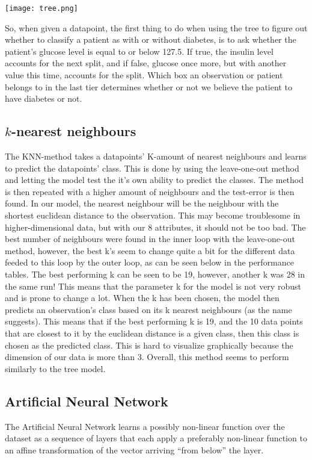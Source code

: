 \texttt{[image: tree.png]}

So, when given a datapoint, the first thing to do when using the tree to figure
out whether to classify a patient as with or without diabetes, is to ask whether
the patient's glucose level is equal to or below 127.5. If true, the insulin level
accounts for the next split, and if false, glucose once more, but with another
value this time, accounts for the split. Which box an observation or patient belongs
to in the last tier determines whether or not we believe the patient to have diabetes
or not.

\subsection{$k$-nearest neighbours}
The KNN-method takes a datapoints' K-amount of nearest neighbours and learns to predict the datapoints' class.
This is done by using the leave-one-out method and letting the model test the it's own ability to predict the classes.
The method is then repeated with a higher amount of neighbours and the test-error is then found. In our model, the nearest
neighbour will be the neighbour with the shortest euclidean distance to the observation.
This may become troublesome in higher-dimensional data, but with our 8 attributes, it should
not be too bad. The best number of neighbours were found in the inner loop with
the leave-one-out method, however, the best k's seem to change quite a bit for the
different data feeded to this loop by the outer loop, as can be seen below in the performance
tables. The best performing k can be seen to be 19, however, another k was
28 in the same run! This means that the parameter k for the model is not very
robust and is prone to change a lot. When the k has been chosen, the model then
predicts an observation's class based on its k nearest neighbours (as the
name suggests). This means that if the best performing k is 19, and the 10
data points that are closest to it by the euclidean distance is a given class,
then this class is chosen as the predicted class. This is hard to visualize
graphically because the dimension of our data is more than 3. Overall, this
method seems to perform similarly to the tree model.

\subsection{Artificial Neural Network}
The Artificial Neural Network learns a possibly non-linear function
over the dataset as a sequence of layers that each apply
a preferably non-linear function to an affine transformation of the vector arriving
``from below'' the layer.

